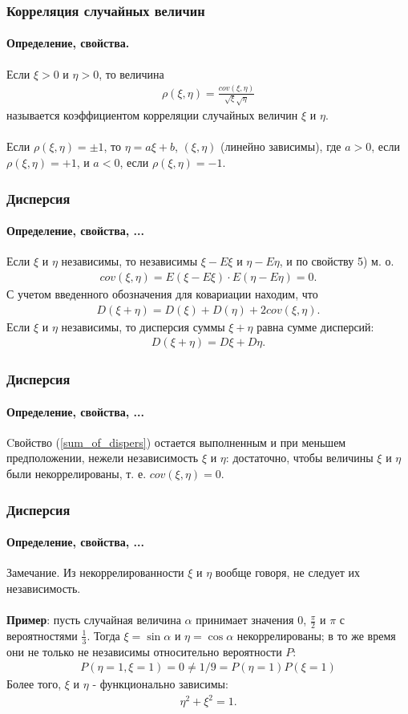 \begin{frame}
\frametitle{Корреляция случайных величин}
\framesubtitle{Определение, свойства.}
Если $\xi > 0$ и $\eta > 0 $, то величина
\pause
\begin{eqnarray*}
    \rho(\xi, \eta) = \frac{cov (\xi, \eta)}{\sqrt{\xi} \sqrt{\eta}}
\end{eqnarray*}
называется коэффициентом корреляции случайных величин $\xi$ и $\eta$.
\\
\\
\pause
Если $\rho(\xi, \eta) = \pm 1$, то 
$\eta = a \xi + b$, $(\xi, \eta)$ (линейно зависимы),
где $a > 0$, если $ \rho(\xi, \eta) = +1$, и $a < 0$, если $\rho(\xi, \eta) = -1$.
\end{frame}

\begin{frame}
\frametitle{Дисперсия}
\framesubtitle{Определение, свойства, ...}
Если $\xi$ и $\eta$ независимы, то независимы $\xi-E\xi$ и $\eta-E\eta$,  и по свойству 5) м. о.
\begin{eqnarray*}
cov(\xi, \eta) = E(\xi - E\xi) · E(\eta - E\eta) = 0.
\end{eqnarray*}
С учетом введенного обозначения для ковариации находим, что
\pause
\begin{eqnarray}\label{sum_of_dispers_0}
\boxed{
    D(\xi + \eta) = D(\xi) + D (\eta) + 2 cov (\xi , \eta).
    }
\end{eqnarray}
Если $\xi$ и $\eta$ независимы, то дисперсия суммы $\xi+\eta$ равна сумме дисперсий:
\begin{eqnarray}\label{sum_of_dispers}
\boxed{
D(\xi+\eta)=D\xi+ D\eta.
}
\end{eqnarray}

\end{frame}

\begin{frame}
\frametitle{Дисперсия}
\framesubtitle{Определение, свойства, ...}
Cвойство (\ref{sum_of_dispers}) остается выполненным и при меньшем предположении, нежели независимость $\xi$ и $\eta$: достаточно, чтобы величины $\xi$ и $\eta$ были некоррелированы, т. е. $cov(\xi , \eta) = 0$.
\end{frame}

\begin{frame}
\frametitle{Дисперсия}
\framesubtitle{Определение, свойства, ...}
\textbf{}{Замечание.}
Из некоррелированности $\xi$ и  $\eta$ вообще говоря, не следует их независимость.
\\
\\
\textbf{Пример}:  пусть случайная величина $\alpha$ принимает значения $0$, $\frac{\pi}{2}$ и $\pi$ с вероятностями $\frac{1}{3}$. Тогда $\xi=\sin \alpha$ и $\eta =\cos \alpha$
некоррелированы; в то же время они не только не независимы относительно вероятности $P$:
\begin{eqnarray*}
P(\eta =1, \xi=1) = 0 \neq  1/9 = P(\eta =1) P(\xi=1)
\end{eqnarray*}
Более того, $\xi$ и  $\eta$ - функционально зависимы: 
\begin{eqnarray*}
\eta ^ 2 + \xi ^ 2 = 1.
\end{eqnarray*}
\end{frame}

